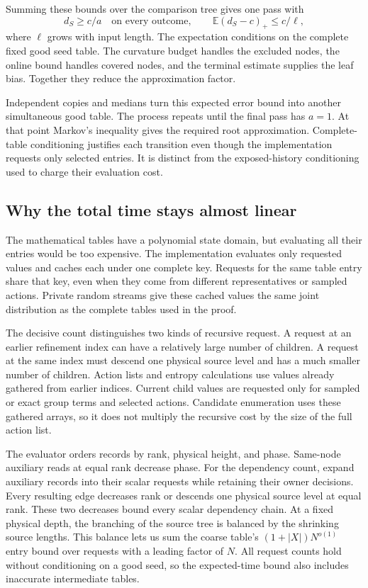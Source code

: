 \documentclass[11pt]{article}
\theoremstyle{definition}
\newcommand{\E}{\mathbb E}
\newcommand{\1}{\mathbf 1}
\begin{document}
Summing these bounds over the comparison tree gives one pass with
\[
 d_S\ge c/a
 \quad\text{on every outcome},\qquad
 \E(d_S-c)_+\le c/\ell,
\]
where $\ell$ grows with input length.
The expectation conditions on the complete fixed good seed table.
The curvature budget handles the excluded nodes, the online bound
handles covered nodes, and the terminal estimate supplies the leaf
bias. Together they reduce the approximation factor.

Independent copies and medians turn this expected error bound into
another simultaneous good table.
The process repeats until the final pass has $a=1$.
At that point Markov's inequality gives the required root
approximation.
Complete-table conditioning justifies each transition even though
the implementation requests only selected entries.
It is distinct from the exposed-history conditioning used to charge
their evaluation cost.

\subsection{Why the total time stays almost linear}

The mathematical tables have a polynomial state domain, but evaluating
all their entries would be too expensive.
The implementation evaluates only requested values and caches each
under one complete key.
Requests for the same table entry share that key, even when they
come from different representatives or sampled actions.
Private random streams give these cached values the same joint
distribution as the complete tables used in the proof.

The decisive count distinguishes two kinds of recursive request.
A request at an earlier refinement index can have a relatively large
number of children.
A request at the same index must descend one physical source level
and has a much smaller number of children.
Action lists and entropy calculations use values already gathered
from earlier indices.
Current child values are requested only for sampled or exact group
terms and selected actions.
Candidate enumeration uses these gathered arrays, so it does not
multiply the recursive cost by the size of the full action list.

The evaluator orders records by rank, physical height, and phase.
Same-node auxiliary reads at equal rank decrease phase. For the dependency count,
expand auxiliary records into their scalar requests while retaining
their owner decisions. Every resulting edge decreases rank or descends
one physical source level at equal rank.
These two decreases bound every scalar dependency chain.
At a fixed physical depth, the branching of the source tree is
balanced by the shrinking source lengths.
This balance lets us sum the coarse table's $(1+|X|)N^{o(1)}$ entry
bound over requests with a leading factor of $N$.
All request counts hold without conditioning on a good seed, so
the expected-time bound also includes inaccurate intermediate tables.
\end{document}
